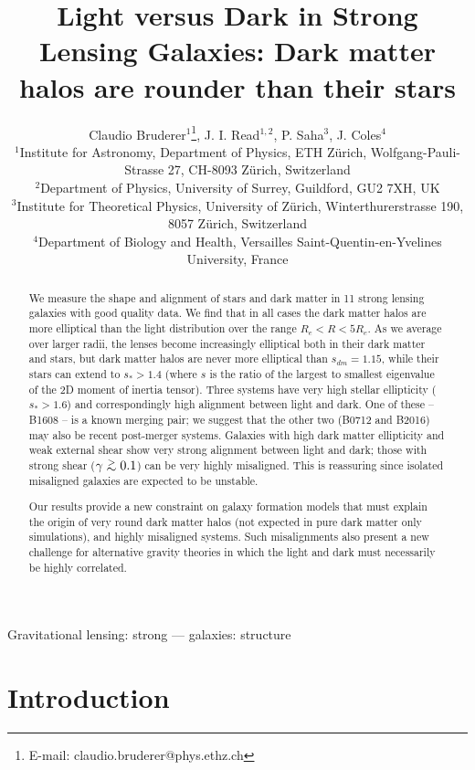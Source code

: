 \documentclass[useAMS,usenatbib]{mn2e}
\title[Light versus Dark in Strong Lensing Galaxies]{Light versus Dark in Strong  Lensing Galaxies: Dark matter halos are rounder than their stars}
\author[Bruderer]{Claudio Bruderer$^{1}$\thanks{E-mail: claudio.bruderer@phys.ethz.ch}, J. I. Read$^{1,2}$, P. Saha$^{3}$, J. Coles$^{4}$\\
$^{1}$Institute for Astronomy, Department of Physics, ETH Z\"urich, Wolfgang-Pauli-Strasse 27, CH-8093 Z\"urich, Switzerland\\
$^{2}$Department of Physics, University of Surrey, Guildford, GU2 7XH, UK\\
$^{3}$Institute for Theoretical Physics, University of Z\"urich, Winterthurerstrasse 190, 8057 Z\"urich, Switzerland\\
$^{4}$Department of Biology and Health, Versailles Saint-Quentin-en-Yvelines University, France
}
\def\gtsima{$\; \buildrel > \over \sim \;$}
\def\simgt{\lower.5ex\hbox{\gtsima}}
\begin{document}
\maketitle

\begin{abstract}
We measure the shape and alignment of stars and dark matter in 11 strong lensing galaxies with good quality data. We find that in all cases the dark matter halos are more elliptical than the light distribution over the range $R_e < R < 5R_e$. As we average over larger radii, the lenses become increasingly elliptical both in their dark matter and stars, but dark matter halos are never more elliptical than $s_{dm} = 1.15$, while their stars can extend to $s_* > 1.4$ (where $s$ is the ratio of the largest to smallest eigenvalue of the 2D moment of inertia tensor). Three systems have very high stellar ellipticity ($s_* > 1.6$) and correspondingly high alignment between light and dark. One of these -- B1608 -- is a known merging pair; we suggest that the other two (B0712 and B2016) may also be recent post-merger systems. Galaxies with high dark matter ellipticity and weak external shear show very strong alignment between light and dark; those with strong shear ($\gamma \simgt 0.1$) can be very highly misaligned. This is reassuring since isolated misaligned galaxies are expected to be unstable. 

Our results provide a new constraint on galaxy formation models that must explain the origin of very round dark matter halos (not expected in pure dark matter only simulations), and highly misaligned systems. Such misalignments also present a new challenge for alternative gravity theories in which the light and dark must necessarily be highly correlated.
\end{abstract}

\begin{keywords}
Gravitational lensing: strong --- galaxies: structure
\end{keywords}


\section{Introduction}\label{sec:introduction}
\end{document}
